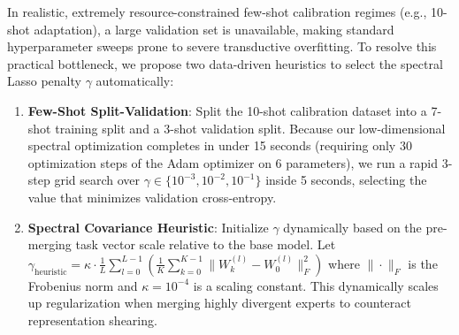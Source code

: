 \begin{remark}
In realistic, extremely resource-constrained few-shot calibration regimes (e.g., 10-shot adaptation), a large validation set is unavailable, making standard hyperparameter sweeps prone to severe transductive overfitting. To resolve this practical bottleneck, we propose two data-driven heuristics to select the spectral Lasso penalty $\gamma$ automatically:
\begin{enumerate}
    \item \textbf{Few-Shot Split-Validation}: Split the 10-shot calibration dataset into a 7-shot training split and a 3-shot validation split. Because our low-dimensional spectral optimization completes in under 15 seconds (requiring only 30 optimization steps of the Adam optimizer on 6 parameters), we run a rapid 3-step grid search over $\gamma \in \{10^{-3}, 10^{-2}, 10^{-1}\}$ inside 5 seconds, selecting the value that minimizes validation cross-entropy.
    \item \textbf{Spectral Covariance Heuristic}: Initialize $\gamma$ dynamically based on the pre-merging task vector scale relative to the base model. Let $\gamma_{\text{heuristic}} = \kappa \cdot \frac{1}{L} \sum_{l=0}^{L-1} \left( \frac{1}{K} \sum_{k=0}^{K-1} \|W_k^{(l)} - W_0^{(l)}\|_F^2 \right)$ where $\| \cdot \|_F$ is the Frobenius norm and $\kappa = 10^{-4}$ is a scaling constant. This dynamically scales up regularization when merging highly divergent experts to counteract representation shearing.
\end{enumerate}
\end{remark}

